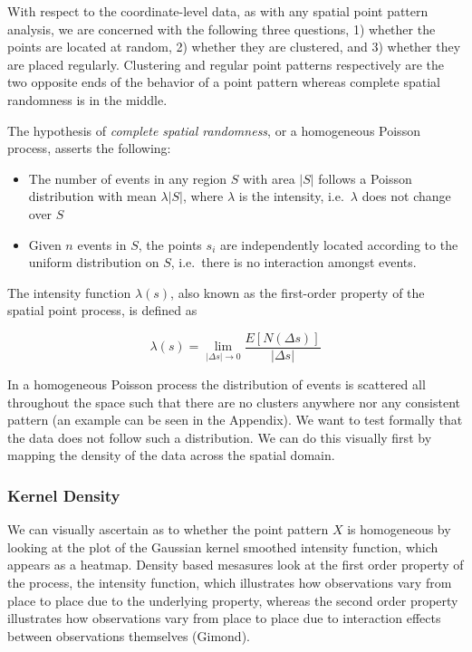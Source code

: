 \documentclass[
  12pt,
]{article}
\providecommand{\tightlist}{%
  \setlength{\itemsep}{0pt}\setlength{\parskip}{0pt}}
\begin{document}
With respect to the coordinate-level data, as with any spatial point
pattern analysis, we are concerned with the following three questions,
1) whether the points are located at random, 2) whether they are
clustered, and 3) whether they are placed regularly. Clustering and
regular point patterns respectively are the two opposite ends of the
behavior of a point pattern whereas complete spatial randomness is in
the middle.

The hypothesis of \emph{complete spatial randomness}, or a homogeneous
Poisson process, asserts the following:

\begin{itemize}
\tightlist
\item
  The number of events in any region \(S\) with area \(|S|\) follows a
  Poisson distribution with mean \(\lambda |S|\), where \(\lambda\) is
  the intensity, i.e.~\(\lambda\) does not change over \(S\)
\item
  Given \(n\) events in \(S\), the points \(s_i\) are independently
  located according to the uniform distribution on \(S\), i.e.~there is
  no interaction amongst events.
\end{itemize}

The intensity function \(\lambda(s)\), also known as the first-order
property of the spatial point process, is defined as

\[\lambda(s) = \lim_{|\Delta s| \to 0} \frac{E[N(\Delta s)]}{| \Delta s|}\]

In a homogeneous Poisson process the distribution of events is scattered
all throughout the space such that there are no clusters anywhere nor
any consistent pattern (an example can be seen in the Appendix). We want
to test formally that the data does not follow such a distribution. We
can do this visually first by mapping the density of the data across the
spatial domain.

\hypertarget{kernel-density}{%
\subsubsection{Kernel Density}\label{kernel-density}}

We can visually ascertain as to whether the point pattern \(X\) is
homogeneous by looking at the plot of the Gaussian kernel smoothed
intensity function, which appears as a heatmap. Density based mesasures
look at the first order property of the process, the intensity function,
which illustrates how observations vary from place to place due to the
underlying property, whereas the second order property illustrates how
observations vary from place to place due to interaction effects between
observations themselves (Gimond).
\end{document}

